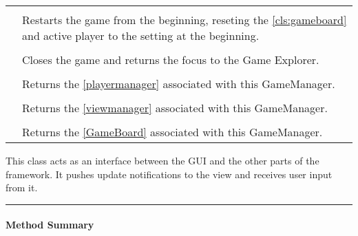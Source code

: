 \begin{longtable}{Lp{10cm}}
	 \\
	& Restarts the game from the beginning, reseting the \ref{cls:gameboard} and active player to the setting at the beginning. \\
	 \\
	& Closes the game and returns the focus to the Game Explorer. \\
	 \\
	& Returns the \ref{playermanager} associated with this GameManager.\\
	 \\
	& Returns the \ref{viewmanager} associated with this GameManager.\\
	 \\
	& Returns the \ref{GameBoard} associated with this GameManager.\\
	

	\hline
\end{longtable}

This class acts as an interface between the \gls{GUI} and the other parts of the \gls{framework}. It pushes update notifications to the view and receives user input from it.  \\

\vspace{.5cm}
\hrule

\paragraph*{Method Summary}
